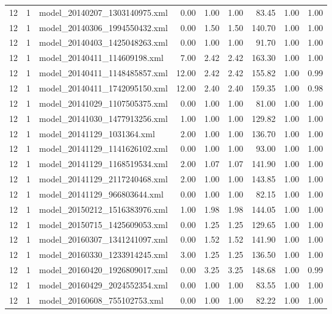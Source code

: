 \begin{table}[ht]
\begin{tabular}{rrlrrrrrr}
   12 &   1 & model\_20140207\_1303140975.xml & 0.00 & 1.00 & 1.00 & 83.45 & 1.00 & 1.00 \\ 
   12 &   1 & model\_20140306\_1994550432.xml & 0.00 & 1.50 & 1.50 & 140.70 & 1.00 & 1.00 \\ 
   12 &   1 & model\_20140403\_1425048263.xml & 0.00 & 1.00 & 1.00 & 91.70 & 1.00 & 1.00 \\ 
   12 &   1 & model\_20140411\_114609198.xml & 7.00 & 2.42 & 2.42 & 163.30 & 1.00 & 1.00 \\ 
   12 &   1 & model\_20140411\_1148485857.xml & 12.00 & 2.42 & 2.42 & 155.82 & 1.00 & 0.99 \\ 
   12 &   1 & model\_20140411\_1742095150.xml & 12.00 & 2.40 & 2.40 & 159.35 & 1.00 & 0.98 \\ 
   12 &   1 & model\_20141029\_1107505375.xml & 0.00 & 1.00 & 1.00 & 81.00 & 1.00 & 1.00 \\ 
   12 &   1 & model\_20141030\_1477913256.xml & 1.00 & 1.00 & 1.00 & 129.82 & 1.00 & 1.00 \\ 
   12 &   1 & model\_20141129\_1031364.xml & 2.00 & 1.00 & 1.00 & 136.70 & 1.00 & 1.00 \\ 
   12 &   1 & model\_20141129\_1141626102.xml & 0.00 & 1.00 & 1.00 & 93.00 & 1.00 & 1.00 \\ 
   12 &   1 & model\_20141129\_1168519534.xml & 2.00 & 1.07 & 1.07 & 141.90 & 1.00 & 1.00 \\ 
   12 &   1 & model\_20141129\_2117240468.xml & 2.00 & 1.00 & 1.00 & 143.85 & 1.00 & 1.00 \\ 
   12 &   1 & model\_20141129\_966803644.xml & 0.00 & 1.00 & 1.00 & 82.15 & 1.00 & 1.00 \\ 
   12 &   1 & model\_20150212\_1516383976.xml & 1.00 & 1.98 & 1.98 & 144.05 & 1.00 & 1.00 \\ 
   12 &   1 & model\_20150715\_1425609053.xml & 0.00 & 1.25 & 1.25 & 129.65 & 1.00 & 1.00 \\ 
   12 &   1 & model\_20160307\_1341241097.xml & 0.00 & 1.52 & 1.52 & 141.90 & 1.00 & 1.00 \\ 
   12 &   1 & model\_20160330\_1233914245.xml & 3.00 & 1.25 & 1.25 & 136.50 & 1.00 & 1.00 \\ 
   12 &   1 & model\_20160420\_1926809017.xml & 0.00 & 3.25 & 3.25 & 148.68 & 1.00 & 0.99 \\ 
   12 &   1 & model\_20160429\_2024552354.xml & 0.00 & 1.00 & 1.00 & 83.55 & 1.00 & 1.00 \\ 
   12 &   1 & model\_20160608\_755102753.xml & 0.00 & 1.00 & 1.00 & 82.22 & 1.00 & 1.00 \\ 

\end{tabular}
\end{table}
